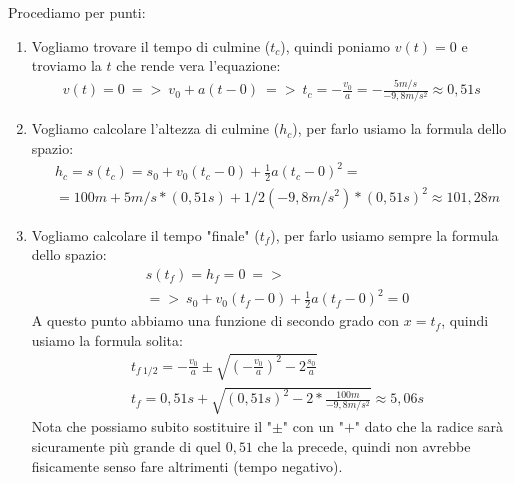 				Procediamo per punti:
				\begin{enumerate}
					\item Vogliamo trovare il tempo di culmine ($t_c$), quindi poniamo $v(t)=0$ e troviamo la $t$ che rende vera l'equazione:
					\begin{align*}
						v(t)=0\ =>\ v_0+a(t-0)\ =>\ t_c=-\frac{v_0}{a} = -\frac{5m/s}{-9,8m/s^2}\approx0,51s
					\end{align*}
					\item Vogliamo calcolare l'altezza di culmine ($h_c$), per farlo usiamo la formula dello spazio:
					\begin{align*}
						&h_c = s(t_c)=s_0+v_0(t_c-0)+\frac{1}{2}a(t_c-0)^2=\\
						&=100m + 5m/s * (0,51s)+1/2(-9,8m/s^2)*(0,51s)^2\approx 101,28m
					\end{align*}
					\item Vogliamo calcolare il tempo "finale" ($t_f$), per farlo usiamo sempre la formula dello spazio:
					\begin{align*}
						&s(t_f)= h_f = 0\ =>\ \\
						&=>\ s_0+v_0(t_f-0)+\frac{1}{2}a(t_f-0)^2=0
					\end{align*}
					A questo punto abbiamo una funzione di secondo grado con $x = t_f$, quindi usiamo la formula solita:
					\begin{align*}
						&t_{f\ 1/2}=-\frac{v_0}{a}\pm\sqrt{(-\frac{v_0}{a})^2-2\frac{s_0}{a}}\\
						&t_f = 0,51s + \sqrt{(0,51 s)^2-2*\frac{100m}{-9,8m/s^2}} \approx 5,06s
					\end{align*}
					Nota che possiamo subito sostituire il "$\pm$" con un "$+$" dato che la radice sarà sicuramente più grande di quel $0,51$ che la precede, quindi non avrebbe fisicamente senso fare altrimenti (tempo negativo).
				\end{enumerate}

